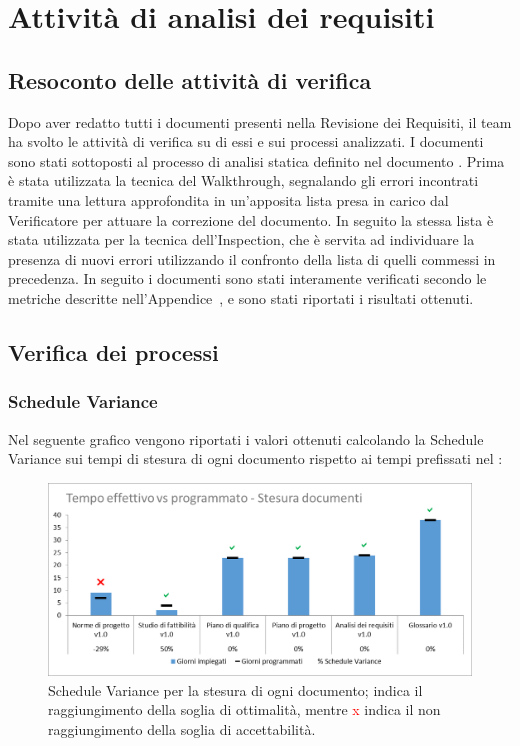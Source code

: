 \newpage
\section{Attività di analisi dei requisiti}
\subsection{Resoconto delle attività di verifica}

Dopo aver redatto tutti i documenti presenti nella Revisione dei Requisiti, il team ha svolto le attività di verifica su di essi e sui processi analizzati. I documenti sono stati sottoposti al processo di analisi statica definito nel documento \NdP{}.
Prima è stata utilizzata la tecnica del Walkthrough, segnalando gli errori incontrati tramite una lettura approfondita in un'apposita lista presa in carico dal Verificatore per attuare la correzione del documento. In seguito la stessa lista è stata utilizzata per la tecnica dell'Inspection, che è servita ad individuare la presenza di nuovi errori utilizzando il confronto della lista di quelli commessi in precedenza.
In seguito i documenti sono stati interamente verificati secondo le metriche descritte nell'Appendice~, e sono stati riportati i risultati ottenuti.

\subsection{Verifica dei processi}
\subsubsection{Schedule Variance}
Nel seguente grafico vengono riportati i valori ottenuti calcolando la Schedule Variance sui tempi di stesura di ogni documento rispetto ai tempi prefissati nel \PdP{}:

\begin{figure}[h!]
	\centering
	\includegraphics[scale=0.75]{img/Grafici/SV-Documenti.png}
		\caption{Schedule Variance per la stesura di ogni documento; \textcolor{green}{\checkmark} indica il raggiungimento della soglia di ottimalità, mentre \textcolor{red}{x} indica il non raggiungimento della soglia di accettabilità.}
	\label{fig:SV-Documenti}
\end{figure}


